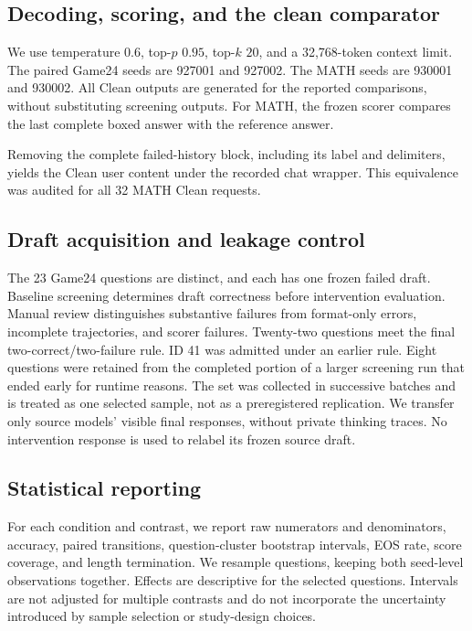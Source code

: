 \documentclass{article}
\newcommand{\clean}{\ifmmode\mathrm{Clean}\else\textup{Clean}\fi}
\begin{document}
\subsection{Decoding, scoring, and the clean comparator}
\label{app:decoding}

We use temperature $0.6$, top-$p$ $0.95$, top-$k$ $20$, and a 32,768-token context limit. The paired Game24 seeds are 927001 and 927002. The MATH seeds are 930001 and 930002. All \clean{} outputs are generated for the reported comparisons, without substituting screening outputs. For MATH, the frozen scorer compares the last complete boxed answer with the reference answer.

Removing the complete failed-history block, including its label and delimiters, yields the \clean{} user content under the recorded chat wrapper. This equivalence was audited for all 32 MATH \clean{} requests.

\subsection{Draft acquisition and leakage control}
\label{app:acquisition}

The 23 Game24 questions are distinct, and each has one frozen failed draft. Baseline screening determines draft correctness before intervention evaluation. Manual review distinguishes substantive failures from format-only errors, incomplete trajectories, and scorer failures. Twenty-two questions meet the final two-correct/two-failure rule. ID 41 was admitted under an earlier rule. Eight questions were retained from the completed portion of a larger screening run that ended early for runtime reasons. The set was collected in successive batches and is treated as one selected sample, not as a preregistered replication. We transfer only source models' visible final responses, without private thinking traces. No intervention response is used to relabel its frozen source draft.

\subsection{Statistical reporting}

For each condition and contrast, we report raw numerators and denominators, accuracy, paired transitions, question-cluster bootstrap intervals, EOS rate, score coverage, and length termination. We resample questions, keeping both seed-level observations together. Effects are descriptive for the selected questions. Intervals are not adjusted for multiple contrasts and do not incorporate the uncertainty introduced by sample selection or study-design choices.
\end{document}
